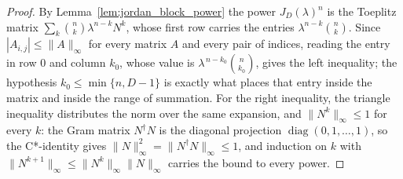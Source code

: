 \begin{proof}
    \leanok
    By Lemma~\ref{lem:jordan_block_power} the power $J_{D}(\lambda)^{n}$ is the
    Toeplitz matrix $\sum_{k}\binom{n}{k}\lambda^{n-k}N^{k}$, whose first row
    carries the entries $\lambda^{n-k}\binom{n}{k}$.  Since
    $|A_{i,j}|\le\|A\|_{\infty}$ for every matrix $A$ and every pair of
    indices, reading the entry in row $0$ and column $k_{0}$, whose value is
    $\lambda^{\,n-k_{0}}\binom{n}{k_{0}}$, gives the left inequality; the
    hypothesis $k_{0}\le\min\{n,D-1\}$ is exactly what places that entry
    inside the matrix and inside the range of summation.  For the right
    inequality, the triangle inequality distributes the norm over the same
    expansion, and $\|N^{k}\|_{\infty}\le 1$ for every $k$: the Gram matrix
    $N^{\dagger}N$ is the diagonal projection
    $\operatorname{diag}(0,1,\dots,1)$, so the C*-identity gives
    $\|N\|_{\infty}^{2}=\|N^{\dagger}N\|_{\infty}\le 1$, and induction on $k$
    with $\|N^{k+1}\|_{\infty}\le\|N^{k}\|_{\infty}\|N\|_{\infty}$ carries the
    bound to every power.
\end{proof}
